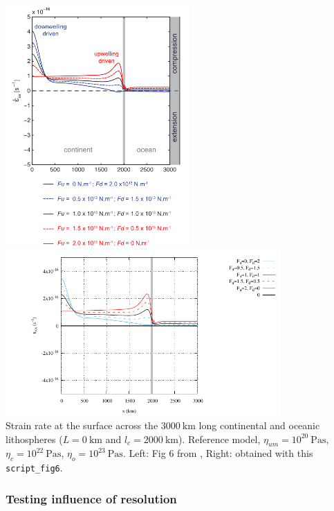 \begin{center}
\includegraphics[width=7cm]{python_codes/fieldstone_143/images/fig6}
\includegraphics[width=10.5cm]{python_codes/fieldstone_143/results/fig6/fig6a}\\
{\captionfont 
Strain rate at the surface across the $3000~\si{\km}$ long continental and 
oceanic lithospheres ($L=0~\si{\km}$ and $l_ c=2000~\si{\km}$).
Reference model, $\eta_{um}=10^{20}~\si{\pascal\second}$, 
$\eta_c=10^{22}~\si{\pascal\second}$, $\eta_o=10^{23}~\si{\pascal\second}$. 
Left: Fig 6 from \cite{yahb13}, Right: obtained with this  {\tt script\_fig6}.}
\end{center}

\subsubsection*{Testing influence of resolution}


